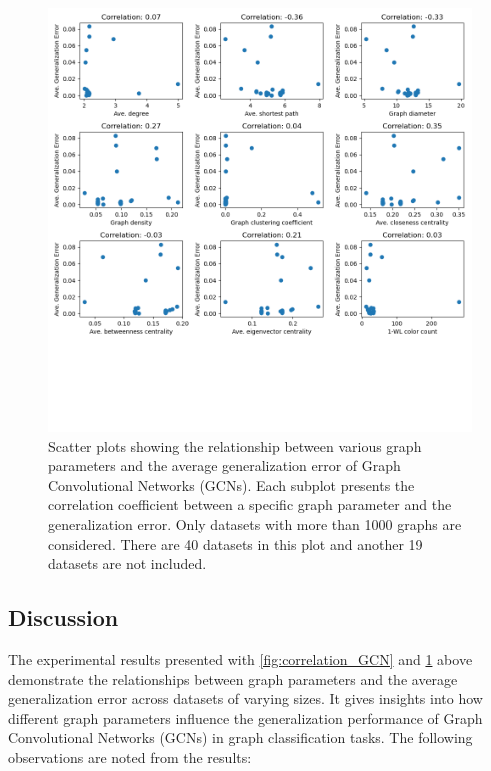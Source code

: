 \begin{figure}[H]
    \centering
    \includegraphics[width=\textwidth]{images/correlation_ignore_less_than_1000_GCN.png}
    \caption{Scatter plots showing the relationship between various graph parameters and the average generalization error of Graph Convolutional Networks (GCNs). Each subplot presents the correlation coefficient between a specific graph parameter and the generalization error. Only datasets with more than 1000 graphs are considered. There are 40 datasets in this plot and another 19 datasets are not included.}
    \label{fig:correlation_ignore_less_than_1000_GCN}
\end{figure}



\subsection{Discussion}

The experimental results presented with \ref{fig:correlation_GCN} and \ref{fig:correlation_ignore_less_than_1000_GCN}  above demonstrate the relationships between graph parameters and the average generalization error across datasets of varying sizes. It gives insights into how different graph parameters influence the generalization performance of Graph Convolutional Networks (GCNs) in graph classification tasks. The following observations are noted from the results:

